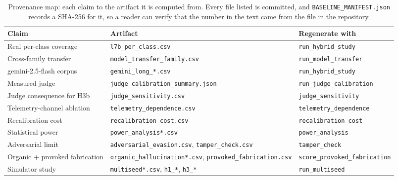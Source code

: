 \documentclass{article}
\begin{document}
\begin{table}[H]
\centering
\caption{Provenance map: each claim to the artifact it is computed from. Every
file listed is committed, and \texttt{BASELINE\_MANIFEST.json} records a SHA-256
for it, so a reader can verify that the number in the text came from the file in
the repository.}
\label{tab:provenance}
\scriptsize
\begin{tabular}{p{2.9cm} p{5.0cm} p{4.3cm}}
\toprule
Claim & Artifact & Regenerate with \\
\midrule
Real per-class coverage & \texttt{l7b\_per\_class.csv} & \texttt{run\_hybrid\_study} \\
Cross-family transfer & \texttt{model\_transfer\_family.csv} & \texttt{run\_model\_transfer} \\
gemini-2.5-flash corpus & \texttt{gemini\_long\_*.csv} & \texttt{run\_hybrid\_study} \\
Measured judge & \texttt{judge\_calibration\_summary.json} & \texttt{run\_judge\_calibration} \\
Judge consequence for H3b & \texttt{judge\_sensitivity.csv} & \texttt{judge\_sensitivity} \\
Telemetry-channel ablation & \texttt{telemetry\_dependence.csv} & \texttt{telemetry\_dependence} \\
Recalibration cost & \texttt{recalibration\_cost.csv} & \texttt{recalibration\_cost} \\
Statistical power & \texttt{power\_analysis*.csv} & \texttt{power\_analysis} \\
Adversarial limit & \texttt{adversarial\_evasion.csv}, \texttt{tamper\_check.csv} & \texttt{tamper\_check} \\
Organic + provoked fabrication & \texttt{organic\_hallucination*.csv}, \texttt{provoked\_fabrication.csv} & \texttt{score\_provoked\_fabrication} \\
Simulator study & \texttt{multiseed*.csv}, \texttt{h1\_*}, \texttt{h3\_*} & \texttt{run\_multiseed} \\
\bottomrule
\end{tabular}
\end{table}



\end{document}
